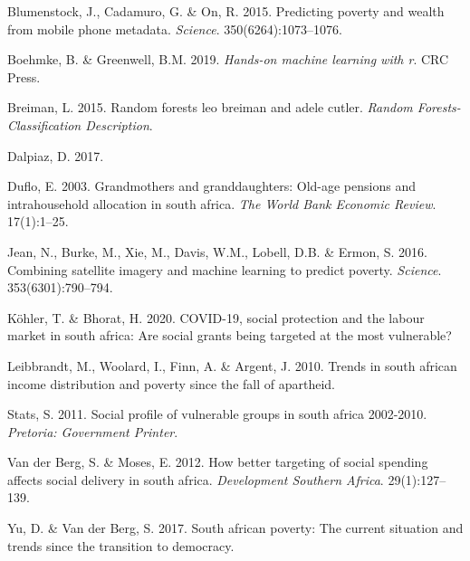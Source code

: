 \documentclass[11pt,preprint, authoryear]{elsarticle}
\numberwithin{equation}{section}
\numberwithin{figure}{section}
\numberwithin{table}{section}
\newlength{\cslhangindent}
\newenvironment{CSLReferences}%
  {\setlength{\parindent}{0pt}%
  \everypar{\setlength{\hangindent}{\cslhangindent}}\ignorespaces}%
  {\par}
\begin{document}
\hypertarget{refs}{}
\begin{CSLReferences}{1}{0}
\leavevmode\hypertarget{ref-blumenstock2015predicting}{}%
Blumenstock, J., Cadamuro, G. \& On, R. 2015. Predicting poverty and
wealth from mobile phone metadata. \emph{Science}. 350(6264):1073--1076.

\leavevmode\hypertarget{ref-boehmke2019hands}{}%
Boehmke, B. \& Greenwell, B.M. 2019. \emph{Hands-on machine learning
with r}. CRC Press.

\leavevmode\hypertarget{ref-breiman2015random}{}%
Breiman, L. 2015. Random forests leo breiman and adele cutler.
\emph{Random Forests-Classification Description}.

\leavevmode\hypertarget{ref-dalpiaz}{}%
Dalpiaz, D. 2017.

\leavevmode\hypertarget{ref-duflo2003}{}%
Duflo, E. 2003. Grandmothers and granddaughters: Old-age pensions and
intrahousehold allocation in south africa. \emph{The World Bank Economic
Review}. 17(1):1--25.

\leavevmode\hypertarget{ref-jean2016combining}{}%
Jean, N., Burke, M., Xie, M., Davis, W.M., Lobell, D.B. \& Ermon, S.
2016. Combining satellite imagery and machine learning to predict
poverty. \emph{Science}. 353(6301):790--794.

\leavevmode\hypertarget{ref-kohler2020covid}{}%
Köhler, T. \& Bhorat, H. 2020. COVID-19, social protection and the
labour market in south africa: Are social grants being targeted at the
most vulnerable?

\leavevmode\hypertarget{ref-leibbrandt2010trends}{}%
Leibbrandt, M., Woolard, I., Finn, A. \& Argent, J. 2010. Trends in
south african income distribution and poverty since the fall of
apartheid.

\leavevmode\hypertarget{ref-stats2011social}{}%
Stats, S. 2011. Social profile of vulnerable groups in south africa
2002-2010. \emph{Pretoria: Government Printer}.

\leavevmode\hypertarget{ref-van2012better}{}%
Van der Berg, S. \& Moses, E. 2012. How better targeting of social
spending affects social delivery in south africa. \emph{Development
Southern Africa}. 29(1):127--139.

\leavevmode\hypertarget{ref-vanderberg2017}{}%
Yu, D. \& Van der Berg, S. 2017. South african poverty: The current
situation and trends since the transition to democracy.

\end{CSLReferences}


\end{document}
